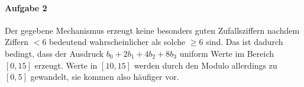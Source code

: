 \documentclass{article}
\newcommand{\cmod}{\text{mod}}
\begin{document}


\paragraph{Aufgabe 2}

Der gegebene Mechanismus erzeugt keine besonders guten Zufallsziffern nachdem Ziffern $< 6$ bedeutend wahrscheinlicher als solche $\geq 6$ sind. Das ist dadurch bedingt, dass der Ausdruck $b_0 + 2b_1 + 4b_2 + 8b_3$ uniform Werte im Bereich $[0, 15]$ erzeugt. Werte in $[10, 15]$ werden durch den Modulo allerdings zu $[0, 5]$ gewandelt, sie kommen also h\"aufiger vor.

\begin{table}[h]
    \centering
    \caption{Relative H\"aufigkeit der m\"oglichen Ziffern, $n = 1000000$.}
\end{table}
\end{document}
